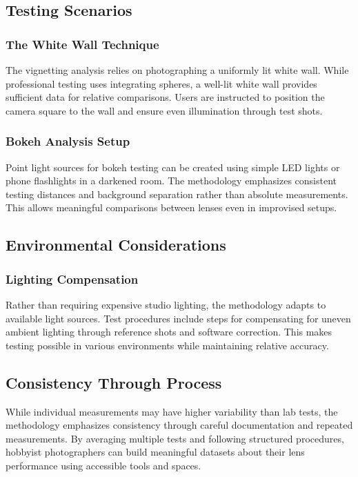 \subsection{Testing Scenarios}
\subsubsection{The White Wall Technique}
The vignetting analysis relies on photographing a uniformly lit white wall. While professional testing uses integrating spheres, a well-lit white wall provides sufficient data for relative comparisons. Users are instructed to position the camera square to the wall and ensure even illumination through test shots.

\subsubsection{Bokeh Analysis Setup} 
Point light sources for bokeh testing can be created using simple LED lights or phone flashlights in a darkened room. The methodology emphasizes consistent testing distances and background separation rather than absolute measurements. This allows meaningful comparisons between lenses even in improvised setups.

\subsection{Environmental Considerations}

\subsubsection{Lighting Compensation}
Rather than requiring expensive studio lighting, the methodology adapts to available light sources. Test procedures include steps for compensating for uneven ambient lighting through reference shots and software correction. This makes testing possible in various environments while maintaining relative accuracy.

\subsection{Consistency Through Process} %
While individual measurements may have higher variability than lab tests, the methodology emphasizes consistency through careful documentation and repeated measurements. By averaging multiple tests and following structured procedures, hobbyist photographers can build meaningful datasets about their lens performance using accessible tools and spaces.

